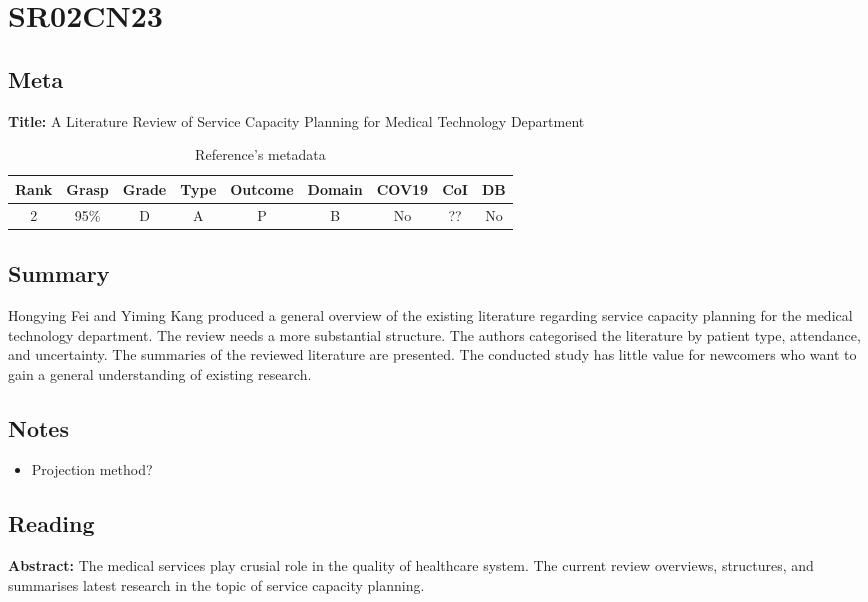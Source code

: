 \section{ SR02CN23 }


\subsection{Meta}

    \textbf{Title:}
    A Literature Review of Service Capacity Planning for Medical Technology Department

    \begin{table}[H]
        \centering
        \begin{tabular}{|c|c|c|c|c|c|c|c|c|}
            \hline
                \textbf{Rank} & \textbf{Grasp} & \textbf{Grade} & \textbf{Type} & \textbf{Outcome} & \textbf{Domain} & \textbf{COV19} & \textbf{CoI} & \textbf{DB} \\
            \hline
                2 & 95\% & D & A & P & B & No & ?? & No \\
            \hline
        \end{tabular}
        \caption{Reference's metadata}
        \label{tab:SR02CN23}
    \end{table}

\subsection{Summary}
    Hongying Fei and Yiming Kang\cite{x243} produced a general overview of the existing literature regarding service capacity planning for the medical technology department. The review needs a more substantial structure. The authors categorised the literature by patient type, attendance, and uncertainty. The summaries of the reviewed literature are presented. The conducted study has little value for newcomers who want to gain a general understanding of existing research.

\subsection{Notes}
    \begin{itemize}
        \item Projection method?
    \end{itemize}


\subsection{Reading}
    \textbf{Abstract:}
    The medical services play crusial role in the quality of healthcare system. The current review overviews, structures, and summarises latest research in the topic of service capacity planning.
    
